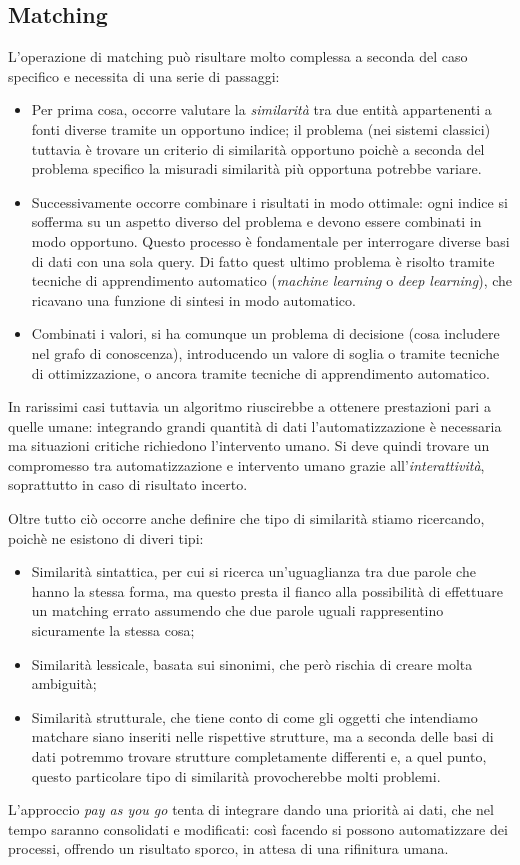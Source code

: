 \documentclass[11pt]{article}
\begin{document}
\subsection{Matching}
L'operazione di matching può risultare molto complessa a seconda del caso specifico e necessita di una serie di passaggi:
\begin{itemize}
\item Per prima cosa, occorre valutare la \textit{similarità} tra due entità appartenenti a fonti diverse tramite un opportuno indice; il problema (nei sistemi classici) tuttavia è trovare un criterio di similarità opportuno poichè a seconda del problema specifico la misuradi similarità più opportuna potrebbe variare.
\item Successivamente occorre combinare i risultati in modo ottimale: ogni indice si sofferma su un aspetto diverso del problema e devono essere combinati in modo opportuno.
Questo processo è fondamentale per interrogare diverse basi di dati con una sola query.
Di fatto quest ultimo problema è risolto tramite tecniche di apprendimento automatico (\textit{machine learning} o \textit{deep learning}), che ricavano una funzione di sintesi in modo automatico.
\item Combinati i valori, si ha comunque un problema di decisione (cosa includere nel grafo di conoscenza), introducendo un valore di soglia o tramite tecniche di ottimizzazione, o ancora tramite tecniche di apprendimento automatico.
\end{itemize}
In rarissimi casi tuttavia un algoritmo riuscirebbe a ottenere prestazioni pari a quelle umane: integrando grandi quantità di dati l'automatizzazione è necessaria ma situazioni critiche richiedono l'intervento umano.
Si deve quindi trovare un compromesso tra automatizzazione e intervento umano grazie all'\textit{interattività}, soprattutto in caso di risultato incerto. 

Oltre tutto ciò occorre anche definire che tipo di similarità stiamo ricercando, poichè ne esistono di diveri tipi:
\begin{itemize}
\item Similarità sintattica, per cui si ricerca un'uguaglianza tra due parole che hanno la stessa forma, ma questo presta il fianco alla possibilità di effettuare un matching errato assumendo che due parole uguali rappresentino sicuramente la stessa cosa;
\item Similarità lessicale, basata sui sinonimi, che però rischia di creare molta ambiguità;
\item Similarità strutturale, che tiene conto di come gli oggetti che intendiamo matchare siano inseriti nelle rispettive strutture, ma a seconda delle basi di dati potremmo trovare strutture completamente differenti e, a quel punto, questo particolare tipo di similarità provocherebbe molti problemi.
\end{itemize}
L'approccio \textit{pay as you go} tenta di integrare dando una priorità ai dati, che nel tempo saranno consolidati e modificati: così facendo si possono automatizzare dei processi, offrendo un risultato sporco, in attesa di una rifinitura umana.
\end{document}
